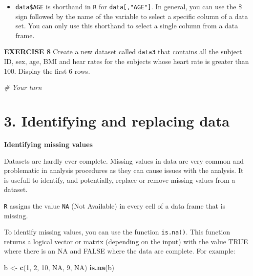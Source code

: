 \documentclass[
]{article}
\newenvironment{Shaded}{\begin{snugshade}}{\end{snugshade}}
\newcommand{\CommentTok}[1]{\textcolor[rgb]{0.56,0.35,0.01}{\textit{#1}}}
\newcommand{\DecValTok}[1]{\textcolor[rgb]{0.00,0.00,0.81}{#1}}
\newcommand{\KeywordTok}[1]{\textcolor[rgb]{0.13,0.29,0.53}{\textbf{#1}}}
\newcommand{\NormalTok}[1]{#1}
\newcommand{\OperatorTok}[1]{\textcolor[rgb]{0.81,0.36,0.00}{\textbf{#1}}}
\newcommand{\OtherTok}[1]{\textcolor[rgb]{0.56,0.35,0.01}{#1}}
\newcommand{\StringTok}[1]{\textcolor[rgb]{0.31,0.60,0.02}{#1}}
\providecommand{\tightlist}{%
  \setlength{\itemsep}{0pt}\setlength{\parskip}{0pt}}
\begin{document}
\begin{Shaded}
\end{Shaded}

\begin{itemize}
\tightlist
\item
  \texttt{data\$AGE} is shorthand in \texttt{R} for
  \texttt{data{[},"AGE"{]}}. In general, you can use the \$ sign
  followed by the name of the variable to select a specific column of a
  data set. You can only use this shorthand to select a single column
  from a data frame.
\end{itemize}

\textbf{EXERCISE 8} Create a new dataset called \texttt{data3} that
contains all the subject ID, sex, age, BMI and hear rates for the
subjects whose heart rate is greater than 100. Display the first 6 rows.

\begin{Shaded}
\begin{Highlighting}[]
\CommentTok{# Your turn}
\end{Highlighting}
\end{Shaded}

\hypertarget{identifying-and-replacing-data}{%
\section{3. Identifying and replacing
data}\label{identifying-and-replacing-data}}

\textbf{Identifying missing values}

Datasets are hardly ever complete. Missing values in data are very
common and problematic in analysis procedures as they can cause issues
with the analysis. It is usefull to identify, and potentially, replace
or remove missing values from a dataset.

\texttt{R} assigns the value \texttt{NA} (Not Available) in every cell
of a data frame that is missing.

To identify missing values, you can use the function \texttt{is.na()}.
This function returns a logical vector or matrix (depending on the
input) with the value TRUE where there is an NA and FALSE where the data
are complete. For example:

\begin{Shaded}
\begin{Highlighting}[]
\NormalTok{b <-}\StringTok{ }\KeywordTok{c}\NormalTok{(}\DecValTok{1}\NormalTok{, }\DecValTok{2}\NormalTok{, }\DecValTok{10}\NormalTok{, }\OtherTok{NA}\NormalTok{, }\DecValTok{9}\NormalTok{, }\OtherTok{NA}\NormalTok{)}
\KeywordTok{is.na}\NormalTok{(b)}
\end{Highlighting}
\end{Shaded}
\end{document}
